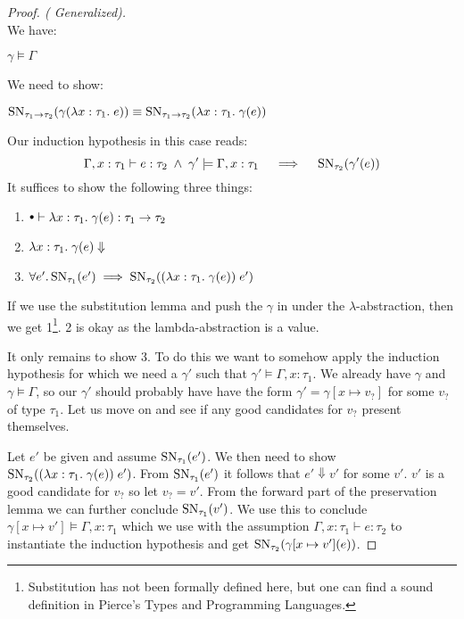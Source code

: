 \begin{proof}[Proof. ( Generalized)]
\case{\TAbs} \\
We have: 
\begin{description}
  \item $\gamma \models \Gamma$
\end{description}
We need to show:
\begin{description}
  \item $\operatorname{SN}_{ \tau_1 \rightarrow \tau_2}(\gamma(\lambda x : \tau_1 . \; e)) \equiv \operatorname{SN}_{ \tau_1 \rightarrow \tau_2}(\lambda x : \tau_1 . \; \gamma(e))$
\end{description}
Our induction hypothesis in this case reads:
\[
  \Gamma,x:\tau_1 \vdash e : \tau_2 \; \wedge \; \gamma' \models \Gamma, x : \tau_1 \quad \implies \quad \operatorname{SN}_{\tau_2}(\gamma'(e))
\]
It suffices to show the following three things:
\begin{enumerate}
\item $\mtenv \vdash \tlabs{x}{\tau_1}{\gamma(e)} : \tarrow{\tau_1}{\tau_2}$
\item $\lambda x : \tau_1 . \; \gamma(e) \Downarrow$
\item $\forall e'. \operatorname{SN}_{\tau_1}(e') \implies \operatorname{SN}_{\tau_2}((\lambda x : \tau_1 . \; \gamma(e)) \; e')$
\end{enumerate}
If we use the substitution lemma and push the $\gamma$ in under the $\lambda$-abstraction, then we get 1\footnote{Substitution has not been formally defined here, but one can find a sound definition in Pierce's Types and Programming Languages.}. 2 is okay as the lambda-abstraction is a value. 

It only remains to show 3. To do this we want to somehow apply the induction hypothesis for which we need a $\gamma'$ such that $\gamma' \models \Gamma, x:\tau_1$. We already have $\gamma$ and $\gamma \models \Gamma$, so our $\gamma'$ should probably have have the form $\gamma' = \gamma[x \mapsto v_?]$ for some $v_?$ of type $\tau_1$. Let us move on and see if any good candidates for $v_?$ present themselves.

Let $e'$ be given and assume $\operatorname{SN}_{\tau_1}(e')$. We then need to show $\operatorname{SN}_{\tau_2}((\lambda x : \tau_1 . \; \gamma(e)) \; e')$. From $\operatorname{SN}_{\tau_1}(e')$ it follows that $e' \Downarrow v'$ for some $v'$. $v'$ is a good candidate for $v_?$ so let $v_? = v'$. From the forward part of the preservation lemma we can further conclude $\operatorname{SN}_{\tau_1}(v')$. We use this to conclude $\gamma[x\mapsto v'] \models \Gamma, x:\tau_1$ which we use with the assumption $\Gamma,x:\tau_1 \vdash e : \tau_2$ to instantiate the induction hypothesis and get $\operatorname{SN}_{\tau_2}(\gamma[x\mapsto v'](e))$.


\end{proof}
